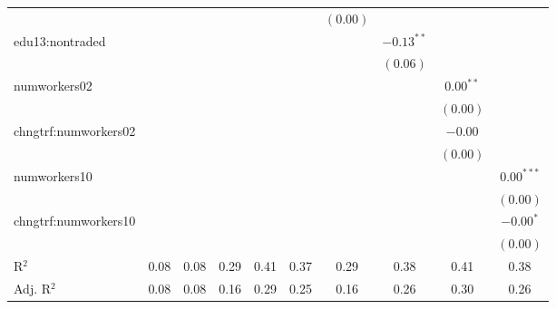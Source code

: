 \begin{table}
\begin{center}
\begin{tabular}{l c c c c c c c c c }
                     &              &              &              &               &               & $(0.00)$     &               &               &               \\
edu13:nontraded      &              &              &              &               &               &              & $-0.13^{**}$  &               &               \\
                     &              &              &              &               &               &              & $(0.06)$      &               &               \\
numworkers02         &              &              &              &               &               &              &               & $0.00^{**}$   &               \\
                     &              &              &              &               &               &              &               & $(0.00)$      &               \\
chngtrf:numworkers02 &              &              &              &               &               &              &               & $-0.00$       &               \\
                     &              &              &              &               &               &              &               & $(0.00)$      &               \\
numworkers10         &              &              &              &               &               &              &               &               & $0.00^{***}$  \\
                     &              &              &              &               &               &              &               &               & $(0.00)$      \\
chngtrf:numworkers10 &              &              &              &               &               &              &               &               & $-0.00^{*}$   \\
                     &              &              &              &               &               &              &               &               & $(0.00)$      \\
\hline
R$^2$                & 0.08         & 0.08         & 0.29         & 0.41          & 0.37          & 0.29         & 0.38          & 0.41          & 0.38          \\
Adj. R$^2$           & 0.08         & 0.08         & 0.16         & 0.29          & 0.25          & 0.16         & 0.26          & 0.30          & 0.26          \\

\end{tabular}
\end{center}
\end{table}
